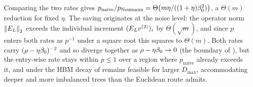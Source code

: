 \begin{remark}\label{rem:E-compare}
Comparing the two rates gives
$p_{\mathrm{naive}}/p_{\mathrm{Neumann}}=\Theta\bigl(m\eta/((1+\eta)\beta_0^2)\bigr)$,
a $\Theta(m)$
reduction for fixed $\eta$. The saving originates at the noise level: the operator
norm $\left\lVert E_{L} \right\rVert_{2}$ exceeds the individual increment $(E_{L}v^{(2)})_i$ by
$\Theta(\sqrt m)$, and since $p$ enters both rates as $p^{-1}$ under a square root
this squares to $\Theta(m)$. Both rates carry $(\rho-\eta\beta_0)^{-2}$ and so
diverge together as $\rho-\eta\beta_0\to0$ (the boundary of ), but the
entry-wise rate stays within $p\le1$ over a region where $p_{\mathrm{naive}}$
already exceeds it, and under the HBM decay of  remains feasible
for larger $D_{\max}$, accommodating deeper and more imbalanced trees than the
Euclidean route admits.
\end{remark}
